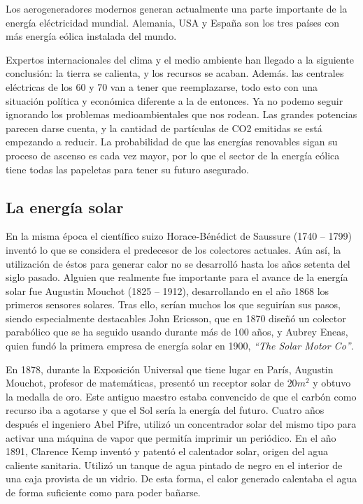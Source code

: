 \documentclass[12pt,letterpaper,superscriptaddress]{article}
\begin{document}
Los aerogeneradores modernos generan actualmente una parte importante de la energía eléctricidad mundial. Alemania, USA y España son los tres países con más energía eólica instalada del mundo.

Expertos internacionales del clima y el medio ambiente han llegado a la siguiente conclusión: la tierra se calienta, y los recursos se acaban. Además. las centrales eléctricas de los 60 y 70 van a tener que reemplazarse, todo esto con una situación política y económica diferente a la de entonces. Ya no podemo seguir ignorando los problemas medioambientales que nos rodean. Las grandes potencias parecen darse cuenta, y la cantidad de partículas de CO2 emitidas se está empezando a reducir. La probabilidad de que las energías renovables sigan su proceso de ascenso es cada vez mayor, por lo que el sector de la energía eólica tiene todas las papeletas para tener su futuro asegurado. 

\clearpage

\subsection{La energía solar}

En la misma época el científico suizo Horace-Bénédict de Saussure (1740 – 1799) inventó lo que se considera el predecesor de los colectores actuales. Aún así, la utilización de éstos para generar calor no se desarrolló hasta los años setenta del siglo pasado. Alguien que realmente fue importante para el avance de la energía solar fue Augustin Mouchot (1825 – 1912), desarrollando en el año 1868 los primeros sensores solares. Tras ello, serían muchos los que seguirían sus pasos, siendo especialmente destacables John Ericsson, que en 1870 diseñó un colector parabólico que se ha seguido usando durante más de 100 años, y Aubrey Eneas, quien fundó la primera empresa de energía solar en 1900, \emph{“The Solar Motor Co”}.

En 1878, durante la Exposición Universal que tiene lugar en París, Augustin Mouchot, profesor de matemáticas, presentó un receptor solar de $ 20 m^{2} $ y obtuvo la medalla de oro. Este antiguo maestro estaba convencido de que el carbón como recurso iba a agotarse y que el Sol sería la energía del futuro. Cuatro años después el ingeniero Abel Pifre, utilizó un concentrador solar del mismo tipo para activar una máquina de vapor que permitía imprimir un periódico. En el año 1891, Clarence Kemp inventó y patentó el calentador solar, origen del agua caliente sanitaria. Utilizó un tanque de agua pintado de negro en el interior de una caja provista de un vidrio. De esta forma, el calor generado calentaba el agua de forma suficiente como para poder bañarse.
\end{document}
